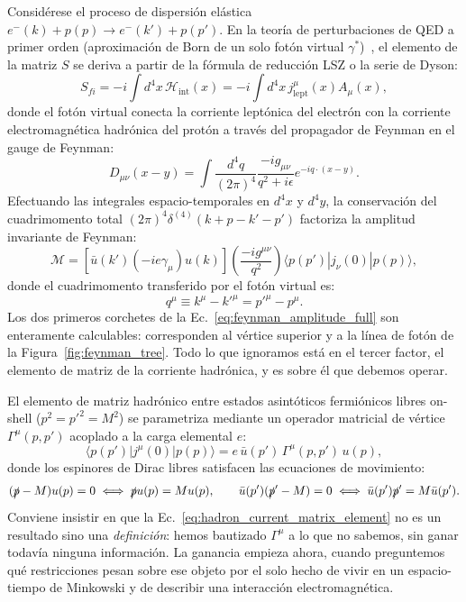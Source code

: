 \documentclass[10pt,a4paper]{article}
\begin{document}
Considérese el proceso de dispersión elástica $e^-(k) + p(p) \to e^-(k') + p(p')$. En la teoría de perturbaciones de QED a primer orden (aproximación de Born de un solo fotón virtual $\gamma^*$)~\cite{halzen1984,thomson2013}, el elemento de la matriz $S$ se deriva a partir de la fórmula de reducción LSZ o la serie de Dyson:
\begin{equation}
S_{fi} = -i \int d^4x \, \mathcal{H}_{\text{int}}(x) = -i \int d^4x \, j^\mu_{\text{lept}}(x) A_\mu(x),
\end{equation}
donde el fotón virtual conecta la corriente leptónica del electrón con la corriente electromagnética hadrónica del protón a través del propagador de Feynman en el gauge de Feynman:
\begin{equation}
D_{\mu\nu}(x - y) = \int \frac{d^4q}{(2\pi)^4} \frac{-i g_{\mu\nu}}{q^2 + i\epsilon} e^{-i q \cdot (x - y)}.
\end{equation}
Efectuando las integrales espacio-temporales en $d^4x$ y $d^4y$, la conservación del cuadrimomento total $(2\pi)^4 \delta^{(4)}(k + p - k' - p')$ factoriza la amplitud invariante de Feynman:
\begin{equation}
\mathcal{M} = \left[ \bar{u}(k') (-ie\gamma_\mu) u(k) \right] \left( \frac{-i g^{\mu\nu}}{q^2} \right) \langle p(p') | j_\nu(0) | p(p) \rangle,
\label{eq:feynman_amplitude_full}
\end{equation}
donde el cuadrimomento transferido por el fotón virtual es:
\begin{equation}
q^\mu \equiv k^\mu - k'^\mu = p'^\mu - p^\mu.
\end{equation}
Los dos primeros corchetes de la Ec.~\eqref{eq:feynman_amplitude_full} son enteramente calculables: corresponden al vértice superior y a la línea de fotón de la Figura~\ref{fig:feynman_tree}. Todo lo que ignoramos está en el tercer factor, el elemento de matriz de la corriente hadrónica, y es sobre él que debemos operar.

El elemento de matriz hadrónico entre estados asintóticos fermiónicos libres on-shell ($p^2 = p'^2 = M^2$) se parametriza mediante un operador matricial de vértice $\Gamma^\mu(p, p')$ acoplado a la carga elemental $e$:
\begin{equation}
\langle p(p') | j^\mu(0) | p(p) \rangle = e\,\bar{u}(p')\,\Gamma^\mu(p, p')\,u(p),
\label{eq:hadron_current_matrix_element}
\end{equation}
donde los espinores de Dirac libres satisfacen las ecuaciones de movimiento:
\begin{equation}
(\slashed{p} - M) u(p) = 0 \iff \slashed{p} u(p) = M u(p), \qquad \bar{u}(p') (\slashed{p}' - M) = 0 \iff \bar{u}(p') \slashed{p}' = M \bar{u}(p').
\label{eq:dirac_free_eqs}
\end{equation}
Conviene insistir en que la Ec.~\eqref{eq:hadron_current_matrix_element} no es un resultado sino una \emph{definición}: hemos bautizado $\Gamma^\mu$ a lo que no sabemos, sin ganar todavía ninguna información. La ganancia empieza ahora, cuando preguntemos qué restricciones pesan sobre ese objeto por el solo hecho de vivir en un espacio-tiempo de Minkowski y de describir una interacción electromagnética.
\end{document}
